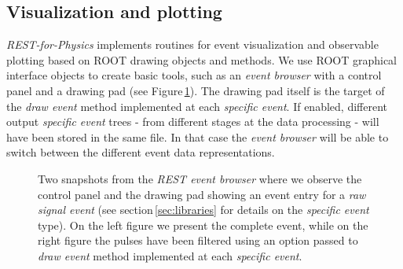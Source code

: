 \subsection{Visualization and plotting}


\emph{REST-for-Physics} implements routines for event visualization and observable plotting based on ROOT drawing objects and methods. We use ROOT graphical interface objects to create basic tools, such as an \emph{event browser} with a control panel and a drawing pad (see Figure\,\ref{fig:eventBrowser}). The drawing pad itself is the target of the \emph{draw event} method implemented at each \emph{specific event}. If enabled, different output \emph{specific event} trees - from different stages at the data processing - will have been stored in the same file. In that case the \emph{event browser} will be able to switch between the different event data representations.

\begin{figure}[htb!]
  \centering
	\caption{Two snapshots from the \emph{REST event browser} where we observe the control panel and the drawing pad showing an event entry for a \emph{raw signal event} (see section\,\ref{sec:libraries} for details on the \emph{specific event} type). On the left figure we present the complete event, while on the right figure the pulses have been filtered using an option passed to \emph{draw event} method implemented at each \emph{specific event}.}\label{fig:eventBrowser}
\end{figure}

